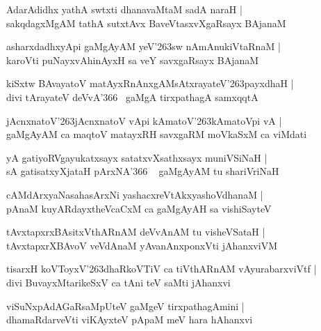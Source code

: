 \documentclass[twoside,12pt,openright]{book}
\def\S{\char'263}
\newcounter{shloka}[chapter]
\begin{document}
\begin{shloka}%
AdarAdidhx yathA swtxti dhanavaMtaM sadA naraH |\\
sakqdagxMgAM tathA sutxtAvx BaveVtasxvXgaRsayx BAjanaM 
\end{shloka}

\begin{shloka}%
asharxdadhxyApi gaMgAyAM yeV\S sw nAmAnukiVtaRnaM |\\
karoVti puNayxvAhinAyxH sa veY savxgaRsayx BAjanaM 
\end{shloka}

\begin{shloka}%
kiSxtw BAvayatoV matAyxRnAnxgAMsAtxrayateV\S payxdhaH |\\
divi tArayateV deVvA\char'366 ~gaMgA tirxpathagA samxqqtA 
\end{shloka}

\begin{shloka}%
jAcnxnatoV\S jAcnxnatoV vApi kAmatoV\S kAmatoVpi vA |\\
gaMgAyAM ca maqtoV matayxRH savxgaRM moVkaSxM ca viMdati
\end{shloka}

\begin{shloka}%
yA gatiyoRVgayukatxsayx satatxvXsathxsayx muniVSiNaH |\\
sA gatisatxyXjataH pArxNA\char'366 ~ gaMgAyAM tu shariVriNaH
\end{shloka}

\begin{shloka}%
cAMdArxyaNasahasArxNi yashacxreVtAkxyashoVdhanaM |\\
pAnaM kuyARdayxtheVcaCxM ca gaMgAyAH sa vishiSayteV 
\end{shloka}

\begin{shloka}%
tAvxtapxrxBAsitxVthARnAM deVvAnAM tu visheVSataH |\\
tAvxtapxrXBAvoV veVdAnaM yAvanAnxponxVti jAhanxviVM 
\end{shloka}

\begin{shloka}%
tisarxH koVToyxV\S dhaRkoVTiV ca tiVthARnAM vAyurabarxviVtf |\\
divi BuvayxMtarikeSxV ca tAni teV saMti jAhanxvi 
\end{shloka}

\begin{shloka}%
viSuNxpAdAGaRsaMpUteV gaMgeV tirxpathagAmini |\\
dhamaRdarveVti viKAyxteV pApaM meV hara hAhanxvi 
\end{shloka}
\end{document}
